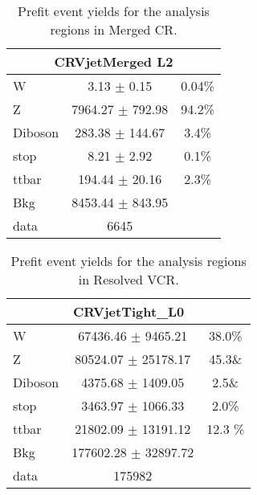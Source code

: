 \begin{table}
\begin{center}
\caption{Prefit event yields for the analysis regions in \Zjets Merged CR.}
\label{tab:PrefitYield_ZCRMer_Per}
\begin{tabular}{|l|c|c|}
\hline
\multicolumn{3}{|c|}{CRVjetMerged L2}\\ \hline
W & 3.13 $\pm$ 0.15 & 0.04\% \\
Z & 7964.27 $\pm$ 792.98 & 94.2\%\\
Diboson & 283.38 $\pm$ 144.67 & 3.4\% \\
stop & 8.21 $\pm$ 2.92 & 0.1\% \\
ttbar & 194.44 $\pm$ 20.16 & 2.3\% \\
\hline
Bkg & 8453.44 $\pm$ 843.95 & \\
\hline
data & 6645 & \\ \hline
\end{tabular}
\end{center}
\end{table}

\begin{table}
\caption{Prefit event yields for the analysis regions in Resolved VCR.}
\label{tab:PrefitYield_VCRRes_Per}
\begin{center}
\begin{tabular}{|l|c|c|}
\hline
\multicolumn{3}{|c|}{CRVjetTight\_L0}\\ \hline
W & 67436.46 $\pm$ 9465.21 & 38.0\% \\
Z & 80524.07 $\pm$ 25178.17 & 45.3\& \\
Diboson & 4375.68 $\pm$ 1409.05 & 2.5\& \\
stop & 3463.97 $\pm$ 1066.33 & 2.0\%  \\
ttbar & 21802.09 $\pm$ 13191.12 & 12.3 \% \\
\hline
Bkg & 177602.28 $\pm$ 32897.72& \\
\hline
data & 175982 & \\ \hline
\end{tabular}
\end{center}
\end{table}

